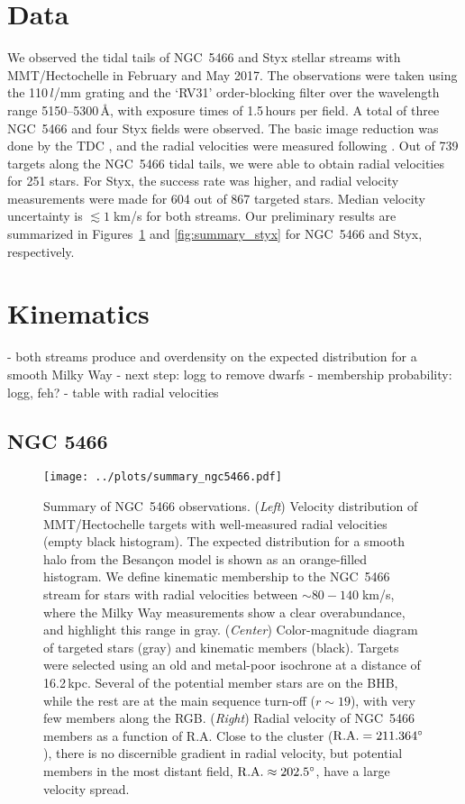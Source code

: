 \documentclass[modern]{aastex61}
\begin{document}
\section{Data}
\label{sec:data}
We observed the tidal tails of NGC~5466 and Styx stellar streams with MMT/Hectochelle \citep{hectospec} in February and May 2017.
The observations were taken using the 110\,$l$/mm grating and the `RV31' order-blocking filter over the wavelength range 5150--5300\,\AA, with exposure times of 1.5\,hours per field.
A total of three NGC~5466 and four Styx fields were observed.
The basic image reduction was done by the TDC \citep{hectoredux}, and the radial velocities were measured following \citet{caldwell2017}.
Out of 739 targets along the NGC~5466 tidal tails, we were able to obtain radial velocities for 251 stars.
For Styx, the success rate was higher, and radial velocity measurements were made for 604 out of 867 targeted stars.
Median velocity uncertainty is $\lesssim1\;$km/s for both streams.
Our preliminary results are summarized in Figures~\ref{fig:summary_ngc5466} and \ref{fig:summary_styx} for NGC~5466 and Styx, respectively.


\section{Kinematics}
\label{sec:vr}
- both streams produce and overdensity on the expected distribution for a smooth Milky Way
- next step: logg to remove dwarfs
- membership probability: logg, feh?
- table with radial velocities

\subsection{NGC 5466}
\label{sec:ngc5466}

\begin{figure}
\begin{center}
\texttt{[image: ../plots/summary\_ngc5466.pdf]}
\caption{Summary of NGC~5466 observations.
(\emph{Left}) Velocity distribution of MMT/Hectochelle targets with well-measured radial velocities (empty black histogram).
The expected distribution for a smooth halo from the Besan\c{c}on model is shown as an orange-filled histogram.
We define kinematic membership to the NGC~5466 stream for stars with radial velocities between $\sim80-140\;$km/s, where the Milky Way measurements show a clear overabundance, and highlight this range in gray.
(\emph{Center}) Color-magnitude diagram of targeted stars (gray) and kinematic members (black).
Targets were selected using an old and metal-poor isochrone at a distance of 16.2\,kpc.
Several of the potential member stars are on the BHB, while the rest are at the main sequence turn-off ($r\sim19$), with very few members along the RGB.
(\emph{Right}) Radial velocity of NGC~5466 members as a function of R.A.
Close to the cluster ($\rm R.A.=211.364^\circ$), there is no discernible gradient in radial velocity, but potential members in the most distant field, $\rm R.A.\approx202.5^\circ$, have a large velocity spread.}
\label{fig:summary_ngc5466}
\end{center}
\end{figure}
\end{document}
